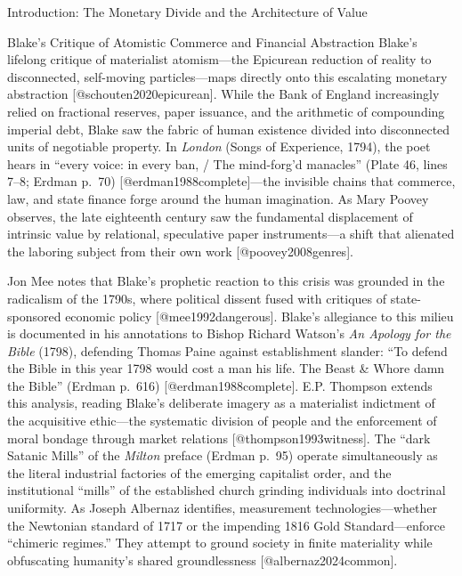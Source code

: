 \documentclass[
  ignorenonframetext,
]{beamer}
\begin{document}
\begin{frame}{Introduction: The Monetary Divide and the Architecture of
Value}
\begin{block}{Blake's Critique of Atomistic Commerce and Financial
Abstraction}
\protect{}\label{blakes-critique-of-atomistic-commerce-and-financial-abstraction}
Blake's lifelong critique of materialist atomism---the Epicurean
reduction of reality to disconnected, self-moving particles---maps
directly onto this escalating monetary abstraction
{[}@schouten2020epicurean{]}. While the Bank of England increasingly
relied on fractional reserves, paper issuance, and the arithmetic of
compounding imperial debt, Blake saw the fabric of human existence
divided into disconnected units of negotiable property. In \emph{London}
(Songs of Experience, 1794), the poet hears in ``every voice: in every
ban, / The mind-forg'd manacles'' (Plate 46, lines 7--8; Erdman p.~70)
{[}@erdman1988complete{]}---the invisible chains that commerce, law, and
state finance forge around the human imagination. As Mary Poovey
observes, the late eighteenth century saw the fundamental displacement
of intrinsic value by relational, speculative paper instruments---a
shift that alienated the laboring subject from their own work
{[}@poovey2008genres{]}.

Jon Mee notes that Blake's prophetic reaction to this crisis was
grounded in the radicalism of the 1790s, where political dissent fused
with critiques of state-sponsored economic policy
{[}@mee1992dangerous{]}. Blake's allegiance to this milieu is documented
in his annotations to Bishop Richard Watson's \emph{An Apology for the
Bible} (1798), defending Thomas Paine against establishment slander:
``To defend the Bible in this year 1798 would cost a man his life. The
Beast \& Whore damn the Bible'' (Erdman p.~616)
{[}@erdman1988complete{]}. E.P. Thompson extends this analysis, reading
Blake's deliberate imagery as a materialist indictment of the
acquisitive ethic---the systematic division of people and the
enforcement of moral bondage through market relations
{[}@thompson1993witness{]}. The ``dark Satanic Mills'' of the
\emph{Milton} preface (Erdman p.~95) operate simultaneously as the
literal industrial factories of the emerging capitalist order, and the
institutional ``mills'' of the established church grinding individuals
into doctrinal uniformity. As Joseph Albernaz identifies, measurement
technologies---whether the Newtonian standard of 1717 or the impending
1816 Gold Standard---enforce ``chimeric regimes.'' They attempt to
ground society in finite materiality while obfuscating humanity's shared
groundlessness {[}@albernaz2024common{]}.
\end{block}


\end{frame}
\end{document}
